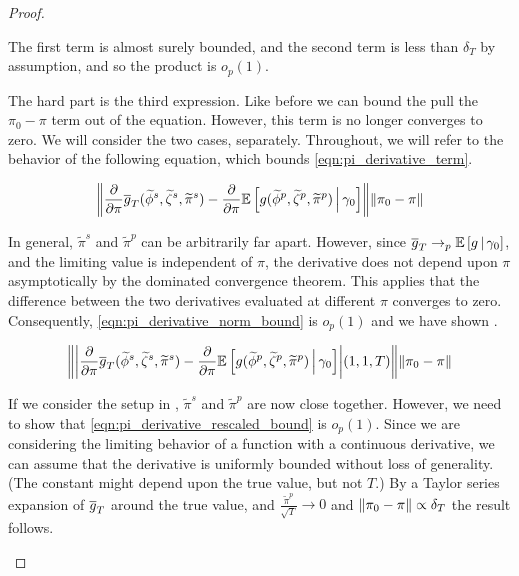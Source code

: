\documentclass[11pt, letterpaper, twoside, final]{article}
\begin{document}
\begin{appendices}
\begin{proof}
\begin{proofpart}
    The first term is almost surely bounded, and the second term is less than $\delta_T$ by assumption, and so the
    product is $o_p(1)$.

    The hard part is the third expression.
    Like before we can bound the pull the $\pi_0 - \pi$ term out of the equation.
    However, this term is no longer converges to zero.
    We will consider the two cases, separately.
    Throughout, we will refer to the behavior of the following equation, which bounds
    \cref{eqn:pi_derivative_term}.


    \begin{equation}
        \norm*{\frac{\partial}{\partial \pi}\sampmom(\widetilde{\phi}^s, \widetilde{\zeta}^s, \widetilde{\pi}^s) -
        \frac{\partial}{\partial \pi} \E\left[\popmom(\widetilde{\phi}^p, \widetilde{\zeta}^p,
        \widetilde{\pi}^p)\mvert \gamma_0\right] } \norm*{\pi_0 - \pi} 
        \label{eqn:pi_derivative_norm_bound}
    \end{equation}

    In general, $\tilde{\pi}^s$ and $\tilde{\pi}^p$ can be arbitrarily far apart.
    However, since $\overline{g}_T \to_p \mathbb{E}\left[g \,\middle\vert\, \gamma_0\right]$, and the limiting value is independent of
    $\pi$, the derivative does not depend upon $\pi$ asymptotically by the dominated convergence theorem.
    This applies that the difference between the two derivatives evaluated at different $\pi$ converges to zero.
    Consequently, \cref{eqn:pi_derivative_norm_bound} is $o_p(1)$ and we have shown .

    \begin{equation}
        \norm*{\abs*{\frac{\partial}{\partial \pi}\sampmom(\widetilde{\phi}^s, \widetilde{\zeta}^s,
        \widetilde{\pi}^s) - \frac{\partial}{\partial \pi} \E\left[\popmom(\widetilde{\phi}^p,
        \widetilde{\zeta}^p, \widetilde{\pi}^p)\mvert \gamma_0\right]} (1, 1, T)} \norm*{\pi_0 - \pi} 
        \label{eqn:pi_derivative_rescaled_bound}
    \end{equation}

    If we consider the setup in , $\tilde{\pi}^s$ and $\tilde{\pi}^p$ are now close together.
    However, we need to show that \cref{eqn:pi_derivative_rescaled_bound} is $o_p(1)$.
    Since we are considering the limiting behavior of a function with a continuous derivative, we can assume that
    the derivative is uniformly bounded without loss of generality. 
    (The constant might depend upon the true value, but not $T$.)
    By a Taylor series expansion of $\overline{g}_T$ around the true value, and $\frac{\widetilde{\pi}^p}{\sqrt{T}} \to
    0$ and $\lVert\pi_0 - \pi\rVert \propto \delta_T$ the result follows.


\end{proofpart}
\end{proof}
\end{appendices}
\end{document}
